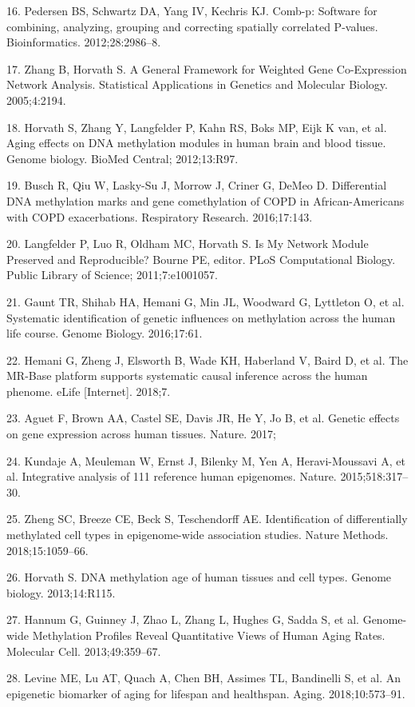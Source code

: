 \documentclass[]{bmcart}
\begin{document}
16. Pedersen BS, Schwartz DA, Yang IV, Kechris KJ. Comb-p: Software for
combining, analyzing, grouping and correcting spatially correlated
P-values. Bioinformatics. 2012;28:2986--8.

17. Zhang B, Horvath S. A General Framework for Weighted Gene
Co-Expression Network Analysis. Statistical Applications in Genetics and
Molecular Biology. 2005;4:2194.

18. Horvath S, Zhang Y, Langfelder P, Kahn RS, Boks MP, Eijk K van, et
al. Aging effects on DNA methylation modules in human brain and blood
tissue. Genome biology. BioMed Central; 2012;13:R97.

19. Busch R, Qiu W, Lasky-Su J, Morrow J, Criner G, DeMeo D.
Differential DNA methylation marks and gene comethylation of COPD in
African-Americans with COPD exacerbations. Respiratory Research.
2016;17:143.

20. Langfelder P, Luo R, Oldham MC, Horvath S. Is My Network Module
Preserved and Reproducible? Bourne PE, editor. PLoS Computational
Biology. Public Library of Science; 2011;7:e1001057.

21. Gaunt TR, Shihab HA, Hemani G, Min JL, Woodward G, Lyttleton O, et
al. Systematic identification of genetic influences on methylation
across the human life course. Genome Biology. 2016;17:61.

22. Hemani G, Zheng J, Elsworth B, Wade KH, Haberland V, Baird D, et al.
The MR-Base platform supports systematic causal inference across the
human phenome. eLife {[}Internet{]}. 2018;7.

23. Aguet F, Brown AA, Castel SE, Davis JR, He Y, Jo B, et al. Genetic
effects on gene expression across human tissues. Nature. 2017;

24. Kundaje A, Meuleman W, Ernst J, Bilenky M, Yen A, Heravi-Moussavi A,
et al. Integrative analysis of 111 reference human epigenomes. Nature.
2015;518:317--30.

25. Zheng SC, Breeze CE, Beck S, Teschendorff AE. Identification of
differentially methylated cell types in epigenome-wide association
studies. Nature Methods. 2018;15:1059--66.

26. Horvath S. DNA methylation age of human tissues and cell types.
Genome biology. 2013;14:R115.

27. Hannum G, Guinney J, Zhao L, Zhang L, Hughes G, Sadda S, et al.
Genome-wide Methylation Profiles Reveal Quantitative Views of Human
Aging Rates. Molecular Cell. 2013;49:359--67.

28. Levine ME, Lu AT, Quach A, Chen BH, Assimes TL, Bandinelli S, et al.
An epigenetic biomarker of aging for lifespan and healthspan. Aging.
2018;10:573--91.
\end{document}
